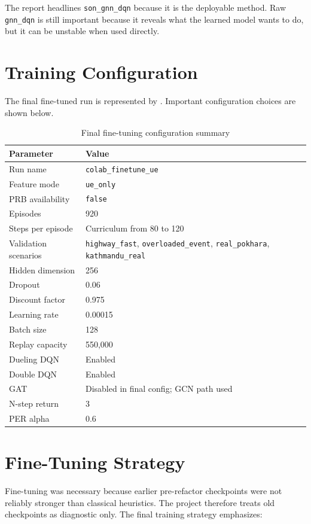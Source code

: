 \documentclass[12pt,a4paper]{report}
\newcommand{\method}{\texttt{son\_gnn\_dqn}}
\newcommand{\rawmethod}{\texttt{gnn\_dqn}}
\newcommand{\ueonly}{\texttt{ue\_only}}
\begin{document}
The report headlines \method{} because it is the deployable method. Raw \rawmethod{} is still important because it reveals what the learned model wants to do, but it can be unstable when used directly.

\section{Training Configuration}
The final fine-tuned run is represented by . Important configuration choices are shown below.

\begin{table}[H]
\centering
\caption{Final fine-tuning configuration summary}
\begin{tabularx}{\textwidth}{p{}Y}
\toprule
\textbf{Parameter} & \textbf{Value}\\
\midrule
Run name & \texttt{colab\_finetune\_ue}\\
Feature mode & \ueonly\\
PRB availability & \texttt{false}\\
Episodes & 920\\
Steps per episode & Curriculum from 80 to 120\\
Validation scenarios & \texttt{highway\_fast}, \texttt{overloaded\_event}, \texttt{real\_pokhara}, \texttt{kathmandu\_real}\\
Hidden dimension & 256\\
Dropout & 0.06\\
Discount factor & 0.975\\
Learning rate & 0.00015\\
Batch size & 128\\
Replay capacity & 550,000\\
Dueling DQN & Enabled\\
Double DQN & Enabled\\
GAT & Disabled in final config; GCN path used\\
N-step return & 3\\
PER alpha & 0.6\\
\bottomrule
\end{tabularx}
\end{table}

\section{Fine-Tuning Strategy}
Fine-tuning was necessary because earlier pre-refactor checkpoints were not reliably stronger than classical heuristics. The project therefore treats old checkpoints as diagnostic only. The final training strategy emphasizes:
\end{document}
